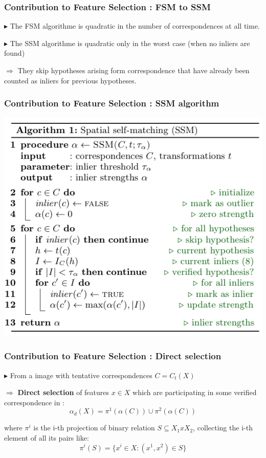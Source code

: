 \documentclass[11pt]{beamer}
\begin{document}
\begin{frame}
\frametitle{Contribution to Feature Selection : FSM to SSM}
$\blacktriangleright$ The FSM algorithme is quadratic in the number of correspondences at all time.

\vspace{0.2cm}
$\blacktriangleright$ The SSM algorithme is quadratic only in the worst case (when no inliers are found)

\vspace{0.2cm}
$\Rightarrow$ They skip hypotheses arising form correspondence that have already been counted as inliers for previous hypotheses.
\end{frame}

\begin{frame}
\frametitle{Contribution to Feature Selection : SSM algorithm}
\begin{center}
\includegraphics[scale=0.97]{algo1.png}
\end{center}
\end{frame}

\begin{frame}
\frametitle{Contribution to Feature Selection : Direct selection}
$\blacktriangleright$ From a image with tentative correspondences $C = C_t(X)$

\vspace{0.2cm}
$\Rightarrow$ \textbf{Direct selection} of features $x \in X$ which are participating in some verified correspondence in :
\[ \alpha_d(X) = \pi^1(\alpha(C)) \cup \pi^2(\alpha(C)) \]

where $\pi^i$ is the i-th projection of binary relation $S \subseteq X_1  x  X_2$, collecting the i-th element of all its pairs like:
\[ \pi^i(S) = \{x^i \in X : (x^1, x^2) \in S\} \]

\end{frame}
\end{document}
